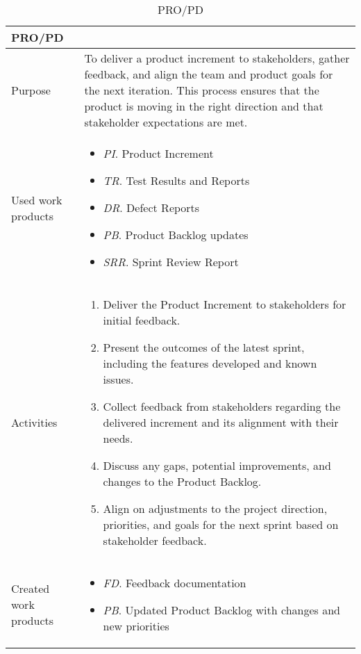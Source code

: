 \begin{table}[h!]
\begin{tabular}{l|p{}}
\hline
\textbf{PRO/PD}        & \textbf{} \\ \hline
Purpose & To deliver a  product increment to stakeholders, gather feedback, and align the team and product goals for the next iteration. This process ensures that the product is moving in the right direction and that stakeholder expectations are met. \\ \hline
Used work products    &      
\begin{itemize}
    \item \textit{PI}. Product Increment
    \item \textit{TR}. Test Results and Reports
    \item \textit{DR}. Defect Reports
    \item \textit{PB}. Product Backlog updates
    \item \textit{SRR}. Sprint Review Report
\end{itemize}
\\ \hline
Activities            &   
\begin{enumerate}
    \item Deliver the Product Increment to stakeholders for initial feedback.
    \item Present the outcomes of the latest sprint, including the features developed and known issues.
    \item Collect feedback from stakeholders regarding the delivered increment and its alignment with their needs.
    \item Discuss any gaps, potential improvements, and changes to the Product Backlog.
    \item Align on adjustments to the project direction, priorities, and goals for the next sprint based on stakeholder feedback.
\end{enumerate}
\\ \hline
Created work products &     
\begin{itemize}
    \item \textit{FD}. Feedback documentation
    \item \textit{PB}. Updated Product Backlog with changes and new priorities
\end{itemize}
\end{tabular}
\caption{PRO/PD}
\label{partial_delivery_feedback_alignment}
\end{table}


\newpage
